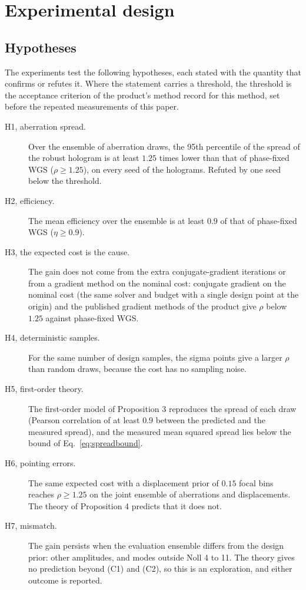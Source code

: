 \section{Experimental design}\label{sec:design}

\subsection{Hypotheses}

The experiments test the following hypotheses, each stated with the quantity that confirms or refutes it. Where the statement carries a threshold, the threshold is the acceptance criterion of the product's method record for this method, set before the repeated measurements of this paper.
\begin{description}
\item[H1, aberration spread.] Over the ensemble of \parNens{} aberration draws, the 95th percentile of the spread of the robust hologram is at least $1.25$ times lower than that of phase-fixed WGS ($\rho\ge1.25$), on every seed of the holograms. Refuted by one seed below the threshold.
\item[H2, efficiency.] The mean efficiency over the ensemble is at least $0.9$ of that of phase-fixed WGS ($\eta\ge0.9$).
\item[H3, the expected cost is the cause.] The gain does not come from the extra conjugate-gradient iterations or from a gradient method on the nominal cost: conjugate gradient on the nominal cost (the same solver and budget with a single design point at the origin) and the published gradient methods of the product give $\rho$ below $1.25$ against phase-fixed WGS.
\item[H4, deterministic samples.] For the same number of design samples, the sigma points give a larger $\rho$ than random draws, because the cost has no sampling noise.
\item[H5, first-order theory.] The first-order model of Proposition 3 reproduces the spread of each draw (Pearson correlation of at least $0.9$ between the predicted and the measured spread), and the measured mean squared spread lies below the bound of Eq.~\eqref{eq:spreadbound}.
\item[H6, pointing errors.] The same expected cost with a displacement prior of $0.15$ focal bins reaches $\rho\ge1.25$ on the joint ensemble of aberrations and displacements. The theory of Proposition 4 predicts that it does not.
\item[H7, mismatch.] The gain persists when the evaluation ensemble differs from the design prior: other amplitudes, and modes outside Noll 4 to 11. The theory gives no prediction beyond (C1) and (C2), so this is an exploration, and either outcome is reported.
\end{description}

